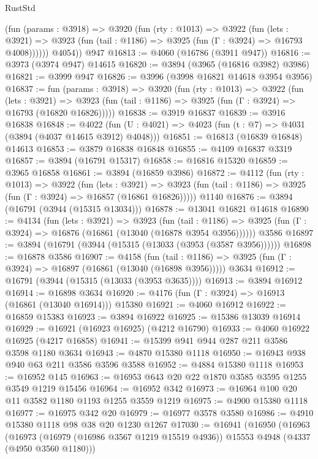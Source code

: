 \begin{lexlean}{RustStd}
\begin{coremodule}
          (fun (params : @3918) =>
          @3920
            (fun (rty : @1013) =>
            @3922
              (fun (lets : @3921) =>
              @3923 (fun (tail : @1186) => @3925 (fun (Γ : @3924) => @16793 @4008))))))
        @4054))
    @947
@16813 := @4060 (@16786 (@3911 @947))
@16816 := @3973 (@3974 @947) @14615
@16820 := @3894 (@3965 (@16816 @3982) @3986)
@16821 := @3999 @947
@16826 := @3996 (@3998 @16821 @14618 @3954 @3956)
@16837 := fun (params : @3918) =>
  @3920
    (fun (rty : @1013) =>
    @3922
      (fun (lets : @3921) =>
      @3923 (fun (tail : @1186) => @3925 (fun (Γ : @3924) => @16793 (@16820 @16826)))))
@16838 := @3919 @16837
@16839 := @3916 @16838
@16848 := @4022
    (fun (U : @4021) => @4023 (fun (t : @7) => @4031 (@3894 (@4037 @14615 @3912) @4048)))
@16851 := @16813 (@16839 @16848) @14613
@16853 := @3879 @16838 @16848
@16855 := @4109 @16837 @3319
@16857 := @3894 (@16791 @15317)
@16858 := @16816 @15320
@16859 := @3965 @16858
@16861 := @3894 (@16859 @3986)
@16872 := @4112
    (fun (rty : @1013) =>
    @3922
      (fun (lets : @3921) =>
      @3923 (fun (tail : @1186) => @3925 (fun (Γ : @3924) => @16857 (@16861 @16826)))))
    @1140
@16876 := @3894 (@16791 (@3944 (@15315 @13034)))
@16878 := @13041 @16821 @14618
@16890 := @4134
    (fun (lets : @3921) =>
    @3923
      (fun (tail : @1186) =>
      @3925 (fun (Γ : @3924) => @16876 (@16861 (@13040 (@16878 @3954 @3956))))))
    @3586
@16897 := @3894 (@16791 (@3944 (@15315 (@13033 (@3953 (@3587 @3956))))))
@16898 := @16878 @3586
@16907 := @4158
    (fun (tail : @1186) => @3925 (fun (Γ : @3924) => @16897 (@16861 (@13040 (@16898 @3956)))))
    @3634
@16912 := @16791 (@3944 (@15315 (@13033 (@3953 @3635))))
@16913 := @3894 @16912
@16914 := @16898 @3634
@16920 := @4176 (fun (Γ : @3924) => @16913 (@16861 (@13040 @16914))) @15380
@16921 := @4060 @16912
@16922 := @16859 @15383
@16923 := @3894 @16922
@16925 := @15386 @13039 @16914
@16929 := @16921 (@16923 @16925) (@4212 @16790)
@16933 := @4060 @16922 @16925 (@4217 @16858)
@16941 := @15399 @941 @944 @287 @211 @3586 @3598 @1180 @3634
@16943 := @4870 @15380 @1118
@16950 := @16943 @938 @940 @63 @211 @3586 @3596 @3588
@16952 := @4884 @15380 @1118
@16953 := @16952 @145
@16963 := @16953 @643 @20 @22 @1870 @3585 @3595 @1255 @3549 @1219 @15456
@16964 := @16952 @342
@16973 := @16964 @100 @20 @11 @3582 @1180 @1193 @1255 @3559 @1219
@16975 := @4900 @15380 @1118
@16977 := @16975 @342 @20
@16979 := @16977 @3578 @3580
@16986 := @4910 @15380 @1118 @98 @38 @20 @1230 @1267
@17030 := @16941
    (@16950
      (@16963
        (@16973 (@16979 (@16986 @3567 @1219 @15519 @4936)) @15553 @4948 (@4337 (@4950 @3560 @1180)))

\end{coremodule}
\end{lexlean}
